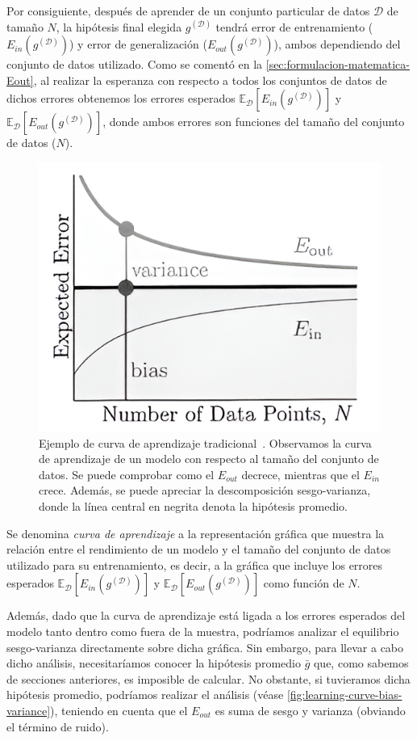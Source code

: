 Por consiguiente, después de aprender de un conjunto particular de datos $\mathcal{D}$ de tamaño $N$, la hipótesis final elegida $g^{(\mathcal{D})}$ tendrá error de entrenamiento ($E_{in}(g^{(\mathcal{D})})$) y error de generalización ($E_{out}(g^{(\mathcal{D})})$), ambos dependiendo del conjunto de datos utilizado. Como se comentó en la \autoref{sec:formulacion-matematica-Eout}, al realizar la esperanza con respecto a todos los conjuntos de datos de dichos errores obtenemos los errores esperados $\mathbb{E}_{\mathcal{D}}[E_{in}(g^{(\mathcal{D})})]$ y $\mathbb{E}_{\mathcal{D}}[E_{out}(g^{(\mathcal{D})})]$, donde ambos errores son funciones del tamaño del conjunto de datos ($N$).\newline

\begin{figure}[h]
    \centering
    \includegraphics[width=0.4\linewidth]{img/learning-curve.png}
    \caption[Ejemplo de curva de aprendizaje tradicional~\cite{Mostafa2012}.] {Ejemplo de curva de aprendizaje tradicional~\cite{Mostafa2012}. Observamos la curva de aprendizaje de un modelo con respecto al tamaño del conjunto de datos. Se puede comprobar como el $E_{out}$ decrece, mientras que el $E_{in}$ crece. Además, se puede apreciar la descomposición sesgo-varianza, donde la línea central en negrita denota la hipótesis promedio.}\label{fig:learning-curve-bias-variance}
\end{figure}

Se denomina \emph{curva de aprendizaje} a la representación gráfica que muestra la relación entre el rendimiento de un modelo y el tamaño del conjunto de datos utilizado para su entrenamiento, es decir, a la gráfica que incluye los errores esperados $\mathbb{E}_{\mathcal{D}}[E_{in}(g^{(\mathcal{D})})]$ y $\mathbb{E}_{\mathcal{D}}[E_{out}(g^{(\mathcal{D})})]$ como función de $N$.\newline

Además, dado que la curva de aprendizaje está ligada a los errores esperados del modelo tanto dentro como fuera de la muestra, podríamos analizar el equilibrio sesgo-varianza directamente sobre dicha gráfica. Sin embargo, para llevar a cabo dicho análisis, necesitaríamos conocer la hipótesis promedio $\bar{g}$ que, como sabemos de secciones anteriores, es imposible de calcular. No obstante, si tuvieramos dicha hipótesis promedio, podríamos realizar el análisis (véase \autoref{fig:learning-curve-bias-variance}), teniendo en cuenta que el $E_{out}$ es suma de sesgo y varianza (obviando el término de ruido).\newline

